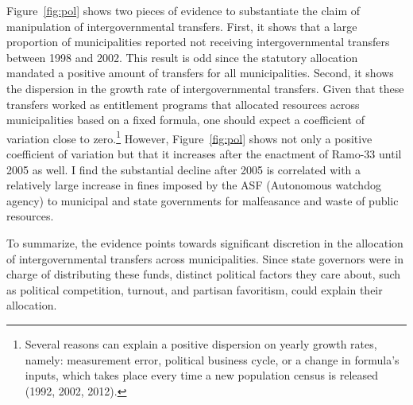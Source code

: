 \documentclass[dv_diss_main.tex]{subfiles}
\begin{document}
Figure~\ref{fig:pol} shows two pieces of evidence to substantiate the claim of manipulation of intergovernmental transfers. First, it shows that a large proportion of municipalities reported not receiving intergovernmental transfers between 1998 and 2002. This result is odd since the statutory allocation mandated a positive amount of transfers for all municipalities. Second, it shows the dispersion in the growth rate of intergovernmental transfers. Given that these transfers worked as entitlement programs that allocated resources across municipalities based on a fixed formula, one should expect a coefficient of variation close to zero.\footnote{
Several reasons can explain a positive dispersion on yearly growth rates, namely:  measurement error, political business cycle, or a change in formula's inputs, which takes place every time a new population census is released (1992, 2002, 2012).}
However, Figure~\ref{fig:pol} shows not only a positive coefficient of variation but that it increases after the enactment of Ramo-33 until 2005 as well. I find the substantial decline after 2005 is correlated with a relatively large increase in fines imposed by the ASF (Autonomous watchdog agency) to municipal and state governments for malfeasance and waste of public resources. 

To summarize, the evidence points towards significant discretion in the allocation of intergovernmental transfers across municipalities. Since state governors were in charge of distributing these funds, distinct political factors they care about, such as political competition, turnout, and partisan favoritism, could explain their allocation. 

\end{document}

